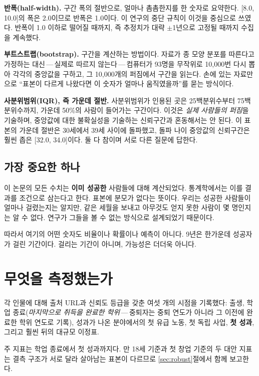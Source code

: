 \documentclass[11pt]{article}
\begin{document}
\textbf{반폭(half-width).} 구간 폭의 절반으로, 얼마나 촘촘한지를 한 숫자로 요약한다.
[8.0, 10.0]의 폭은 2.0이므로 반폭은 1.0이다. 이 연구의 중단 규칙이 이것을 중심으로
쓰였다. 반폭이 1.0 이하로 떨어질 때까지, 즉 추정치가 대략 $\pm$1년으로 고정될 때까지
수집을 계속했다.

\textbf{부트스트랩(bootstrap).} 구간을 계산하는 방법이다. 자료가 종 모양 분포를 따른다고
가정하는 대신\,---\,실제로 따르지 않는다\,---\,컴퓨터가 93명을 무작위로 10{,}000번 다시
뽑아 각각의 중앙값을 구하고, 그 10{,}000개의 퍼짐에서 구간을 읽는다. 손에 있는 자료만으로
``표본이 다르게 나왔다면 이 숫자가 얼마나 움직였을까''를 묻는 방식이다.

\textbf{사분위범위(IQR), 즉 가운데 절반.} 사분위범위가 인용된 곳은 25백분위수부터
75백분위수까지, 가운데 50\%의 사람이 들어가는 구간이다. 이것은 \emph{실제 사람들의
퍼짐}을 기술하며, 중앙값에 대한 불확실성을 기술하는 신뢰구간과 혼동해서는 안 된다. 이
표본의 가운데 절반은 30세에서 39세 사이에 돌파했고, 돌파 나이 중앙값의 신뢰구간은 훨씬
좁은 [32.0, 34.0]이다. 둘 다 참이며 서로 다른 질문에 답한다.

\subsection*{가장 중요한 하나}

이 논문의 모든 수치는 \textbf{이미 성공한} 사람들에 대해 계산되었다. 통계학에서는 이를
결과를 조건으로 삼는다고 한다. 표본에 분모가 없다는 뜻이다. 우리는 성공한 사람들이 얼마나
걸렸는지는 알지만, 같은 세월을 보내고 아무것도 얻지 못한 사람이 몇 명인지는 알 수 없다.
연구가 그들을 볼 수 없는 방식으로 설계되었기 때문이다.

따라서 여기의 어떤 숫자도 비율이나 확률이나 예측이 아니다. 9년은 한가운데 성공자가 걸린
기간이다. 걸리는 기간이 아니며, 가능성은 더더욱 아니다.

\section{무엇을 측정했는가}

각 인물에 대해 출처 URL과 신뢰도 등급을 갖춘 여섯 개의 시점을 기록했다: 출생,
학업 종료(\emph{마지막으로 취득을 완료한 학위}\,---\,중퇴자는 중퇴 연도가 아니라 그
이전에 완료한 학위 연도로 기록), 성과가 나온 분야에서의 첫 유급 노동, 첫 독립 사업,
\textbf{첫 성과}, 그리고 훨씬 뒤의 대규모 이정표.

주 지표는 학업 종료에서 첫 성과까지다. 만 18세 기준과 첫 창업 기준의 두 대안 지표는
결측 구조가 서로 달라 살아남는 표본이 다르므로 \ref{sec:robust}절에서 함께 보고한다.
\end{document}
